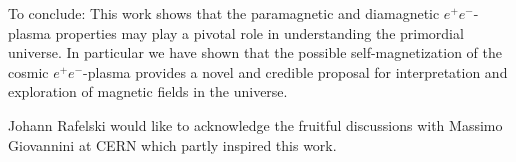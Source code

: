 \documentclass[aps,prd,floatfix,reprint]{revtex4-2}
\begin{document}
To conclude: This work shows that the paramagnetic and diamagnetic $e^{+}e^{-}$-plasma properties may play a pivotal role in understanding the primordial universe. In particular we have shown that the possible self-magnetization of the cosmic $e^{+}e^{-}$-plasma  provides a novel and credible proposal for interpretation and exploration of magnetic fields in the universe. 


\acknowledgments
\label{sec:ack}
\noindent Johann Rafelski would like to acknowledge the fruitful discussions with Massimo Giovannini at CERN which partly inspired this work.



\end{document}
